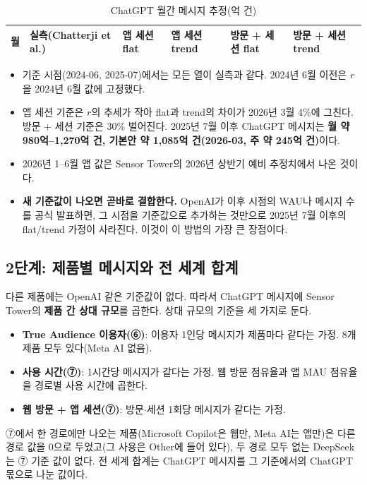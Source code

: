 \documentclass[11pt]{article}
\begin{document}
\begin{longtable}{L{2.2cm}R{2.6cm}R{2.4cm}R{2.4cm}R{2.8cm}R{2.8cm}}
\caption{ChatGPT 월간 메시지 추정(억 건)}\label{tab:series}\\
\toprule
월 & 실측(Chatterji et al.) & 앱 세션 flat & 앱 세션 trend & 방문 + 세션 flat & 방문 + 세션 trend \\
\midrule
\endhead

\bottomrule
\end{longtable}

\begin{itemize}
  \item 기준 시점(2024-06, 2025-07)에서는 모든 열이 실측과 같다. 2024년 6월 이전은 $r$을 2024년 6월 값에 고정했다.
  \item 앱 세션 기준은 $r$의 추세가 작아 flat과 trend의 차이가 2026년 3월 4\%에 그친다. 방문 + 세션 기준은 30\% 벌어진다. 2025년 7월 이후 ChatGPT 메시지는 \textbf{월 약 980억--1,270억 건, 기본안 약 1,085억 건(2026-03, 주 약 245억 건)}이다.
  \item 2026년 1--6월 앱 값은 Sensor Tower의 2026년 상반기 예비 추정치에서 나온 것이다.
  \item \textbf{새 기준값이 나오면 곧바로 결합한다.} OpenAI가 이후 시점의 WAU나 메시지 수를 공식 발표하면, 그 시점을 기준값으로 추가하는 것만으로 2025년 7월 이후의 flat/trend 가정이 사라진다. 이것이 이 방법의 가장 큰 장점이다.
\end{itemize}

\subsection{2단계: 제품별 메시지와 전 세계 합계}\label{sec:prod}

다른 제품에는 OpenAI 같은 기준값이 없다. 따라서 ChatGPT 메시지에 Sensor Tower의 \textbf{제품 간 상대 규모}를 곱한다. 상대 규모의 기준을 세 가지로 둔다.
\begin{itemize}
  \item \textbf{True Audience 이용자(⑥)}: 이용자 1인당 메시지가 제품마다 같다는 가정. 8개 제품 모두 있다(Meta AI 없음).
  \item \textbf{사용 시간(⑦)}: 1시간당 메시지가 같다는 가정. 웹 방문 점유율과 앱 MAU 점유율을 경로별 사용 시간에 곱한다.
  \item \textbf{웹 방문 + 앱 세션(⑦)}: 방문$\cdot$세션 1회당 메시지가 같다는 가정.
\end{itemize}
⑦에서 한 경로에만 나오는 제품(Microsoft Copilot은 웹만, Meta AI는 앱만)은 다른 경로 값을 0으로 두었고(그 사용은 Other에 들어 있다), 두 경로 모두 없는 DeepSeek는 ⑦ 기준 값이 없다. 전 세계 합계는 ChatGPT 메시지를 그 기준에서의 ChatGPT 몫으로 나눈 값이다.
\end{document}
